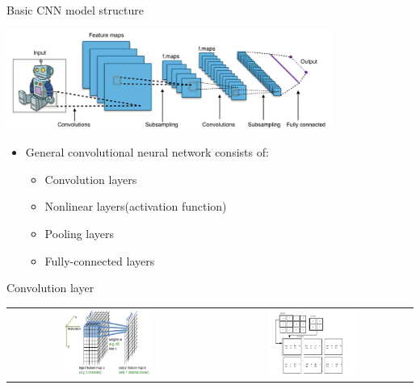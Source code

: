 \documentclass{beamer}
\begin{document}
\begin{CJK*}{UTF8}{gbsn}
\begin{frame}{Basic CNN model structure}
\begin{center}
\includegraphics[width=0.8\textwidth]{figures/CNNPic}
\end{center}
\begin{itemize}
\item General convolutional neural network consists of:
\begin{itemize}
\item Convolution layers
\item Nonlinear layers(activation function)
\item Pooling layers
\item Fully-connected layers

\end{itemize}
\end{itemize}
\end{frame}


\begin{frame}{Convolution layer}
\begin{tabular}{cc}
\includegraphics[width=0.45\textwidth]{figures/CNNLayer1} & 
\includegraphics[width=0.45\textwidth]{figures/CNNLayer2}
\end{tabular}
\end{frame}



\end{CJK*}
\end{document}
